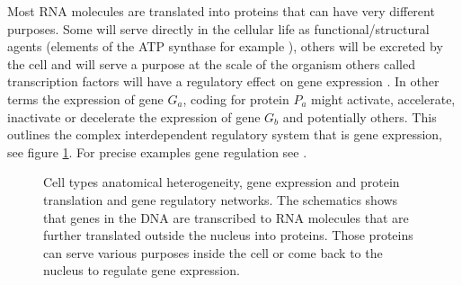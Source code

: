 	Most RNA molecules are translated into proteins that can have very different purposes. Some will serve directly in the cellular life as functional/structural agents (elements of the ATP synthase for example \cite{boyer97}), others will be excreted by the cell and will serve a purpose at the scale of the organism \cite{kaiser84} others called transcription factors will have a regulatory effect on gene expression \cite{mitchell89}. In other terms the expression of gene $G_a$, coding for protein $P_a$ might activate, accelerate, inactivate or decelerate the expression of gene $G_b$ and potentially others. This outlines the complex interdependent regulatory system that is gene expression, see figure \ref{fig:cells}. For precise examples gene regulation see \cite{gossen92, shinozaki03,fuqua01,balmer02}.\\
	
\begin{figure}[bth]
        \myfloatalign
         \quad
        \caption{Cell types anatomical heterogeneity, gene expression and protein translation and gene regulatory networks. The schematics shows that genes in the DNA are transcribed to RNA molecules that are further translated outside the nucleus into proteins. Those proteins can serve various purposes inside the cell or come back to the nucleus to regulate gene expression.}\label{fig:cells}
\end{figure}
	
